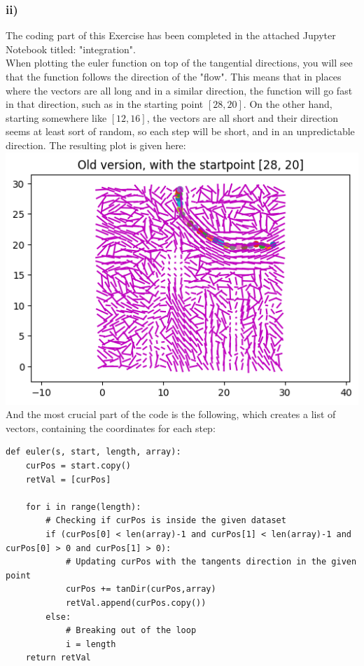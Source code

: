 \subsubsection{ii)}
The coding part of this Exercise has been completed in the attached Jupyter Notebook titled: "integration". \\
When plotting the euler function on top of the tangential directions, you will see that the function follows the direction of the "flow". This means that in places where the vectors are all long and in a similar direction, the function will go fast in that direction, such as in the starting point $[28,20]$. On the other hand, starting somewhere like $[12,16]$, the vectors are all short and their direction seems at least sort of random, so each step will be short, and in an unpredictable direction.
The resulting plot is given here: \\
\includegraphics[width=0.75\linewidth]{old2820} \\
And the most crucial part of the code is the following, which creates a list of vectors, containing the coordinates for each step:
\begin{verbatim}
def euler(s, start, length, array):
    curPos = start.copy()
    retVal = [curPos]
    
    for i in range(length):
        # Checking if curPos is inside the given dataset
        if (curPos[0] < len(array)-1 and curPos[1] < len(array)-1 and curPos[0] > 0 and curPos[1] > 0):
            # Updating curPos with the tangents direction in the given point
            curPos += tanDir(curPos,array)
            retVal.append(curPos.copy())
        else:
            # Breaking out of the loop
            i = length
    return retVal
\end{verbatim}

